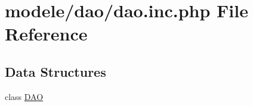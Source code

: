 \hypertarget{dao_8inc_8php}{}\section{modele/dao/dao.inc.\+php File Reference}
\label{dao_8inc_8php}
\subsection*{Data Structures}
\begin{DoxyCompactItemize}
\item 
class \hyperlink{class_d_a_o}{D\+AO}
\end{DoxyCompactItemize}
